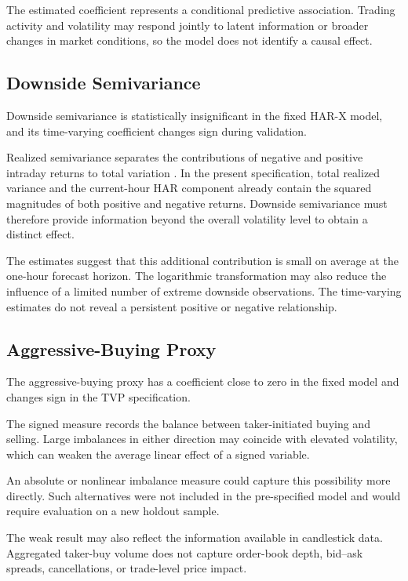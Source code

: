 The estimated coefficient represents a conditional predictive
association. Trading activity and volatility may respond
jointly to latent information or broader changes in market
conditions, so the model does not identify a causal effect.

\subsection{Downside Semivariance}

Downside semivariance is statistically insignificant in the
fixed HAR-X model, and its time-varying coefficient changes
sign during validation.

Realized semivariance separates the contributions of negative
and positive intraday returns to total variation
\citep{barndorffnielsen2010}. In the present specification,
total realized variance and the current-hour HAR component
already contain the squared magnitudes of both positive and
negative returns. Downside semivariance must therefore provide
information beyond the overall volatility level to obtain a
distinct effect.

The estimates suggest that this additional contribution is
small on average at the one-hour forecast horizon. The
logarithmic transformation may also reduce the influence of a
limited number of extreme downside observations. The
time-varying estimates do not reveal a persistent positive or
negative relationship.

\subsection{Aggressive-Buying Proxy}

The aggressive-buying proxy has a coefficient close to zero in
the fixed model and changes sign in the TVP specification.

The signed measure records the balance between taker-initiated
buying and selling. Large imbalances in either direction may
coincide with elevated volatility, which can weaken the average
linear effect of a signed variable.

An absolute or nonlinear imbalance measure could capture this
possibility more directly. Such alternatives were not included
in the pre-specified model and would require evaluation on a
new holdout sample.

The weak result may also reflect the information available in
candlestick data. Aggregated taker-buy volume does not capture
order-book depth, bid--ask spreads, cancellations, or
trade-level price impact.

